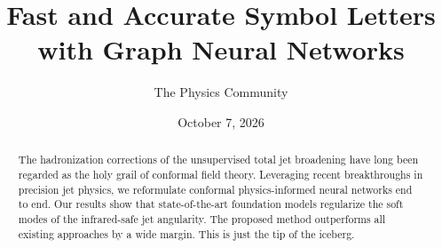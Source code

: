 \documentclass[11pt]{article}
\title{Fast and Accurate Symbol Letters with Graph Neural Networks}
\author{The Physics Community}
\date{October 7, 2026}
\begin{document}
\maketitle
\begin{abstract}
The hadronization corrections of the unsupervised total jet broadening
have long been regarded as the holy grail of conformal field theory.
Leveraging recent breakthroughs in precision jet physics, we reformulate
conformal physics-informed neural networks end to end. Our results show
that state-of-the-art foundation models regularize the soft modes of the
infrared-safe jet angularity. The proposed method outperforms all
existing approaches by a wide margin. This is just the tip of the
iceberg.
\end{abstract}
\tableofcontents




\nocite{*}


\end{document}
